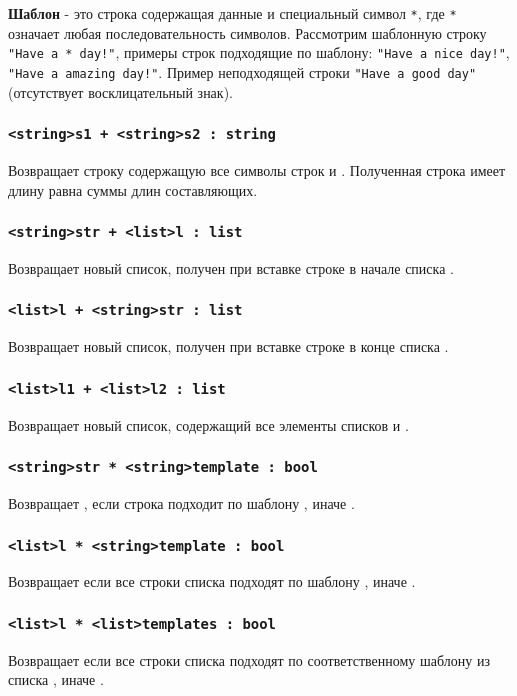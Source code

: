 \documentclass[a4paper, 14pt]{extarticle}
\begin{document}
{\bf Шаблон} - это строка содержащая данные и специальный символ \lstinline`*`, где \lstinline`*` означает любая последовательность символов. Рассмотрим шаблонную строку \lstinline`"Have a * day!"`, примеры строк подходящие по шаблону: \lstinline`"Have a nice day!"`, \lstinline`"Have a amazing day!"`. Пример неподходящей строки \lstinline`"Have a good day"` (отсутствует восклицательный знак).

\subsubsection{\lstinline`<string>s1 + <string>s2 : string`}
Возвращает строку содержащую все символы строк  и . Полученная строка имеет длину равна суммы длин составляющих.

\subsubsection{\lstinline`<string>str + <list>l : list`}
Возвращает новый список, получен при вставке строке  в начале списка .

\subsubsection{\lstinline`<list>l + <string>str : list`}
Возвращает новый список, получен при вставке строке  в конце списка .

\subsubsection{\lstinline`<list>l1 + <list>l2 : list`}
Возвращает новый список, содержащий все элементы списков  и .

\subsubsection{\lstinline`<string>str * <string>template : bool`}
Возвращает \true{}, если строка  подходит по шаблону , иначе \false{}.

\subsubsection{\lstinline`<list>l * <string>template : bool`}
Возвращает \true{} если все строки списка  подходят по шаблону , иначе \false{}.

\subsubsection{\lstinline`<list>l * <list>templates : bool`}
Возвращает \true{} если все строки списка  подходят по соответственному шаблону из списка , иначе \false{}.
\end{document}
